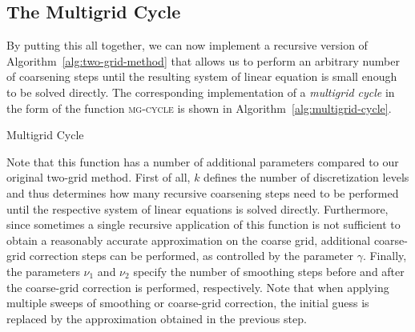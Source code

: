 \subsection{The Multigrid Cycle}\label{sec:multigrid-cycles}
By putting this all together, we can now implement a recursive version of Algorithm~\ref{alg:two-grid-method} that allows us to perform an arbitrary number of coarsening steps until the resulting system of linear equation is small enough to be solved directly.
The corresponding implementation of a \emph{multigrid cycle} in the form of the function \textsc{mg-cycle} is shown in Algorithm~\ref{alg:multigrid-cycle}.
\begin{algorithm}[ht]
	\caption{Multigrid Cycle}
	\label{alg:multigrid-cycle}
	\begin{algorithmic}
		\EndFor
		\Else
		\EndFor
		\EndIf
		\EndFor
		\State {}
		\EndFunction
	\end{algorithmic}
\end{algorithm}
Note that this function has a number of additional parameters compared to our original two-grid method.
First of all, $k$ defines the number of discretization levels and thus determines how many recursive coarsening steps need to be performed until the respective system of linear equations is solved directly.
Furthermore, since sometimes a single recursive application of this function is not sufficient to obtain a reasonably accurate approximation on the coarse grid, additional coarse-grid correction steps can be performed, as controlled by the parameter $\gamma$.
Finally, the parameters $\nu_1$ and $\nu_2$ specify the number of smoothing steps before and after the coarse-grid correction is performed, respectively.
Note that when applying multiple sweeps of smoothing or coarse-grid correction, the initial guess is replaced by the approximation obtained in the previous step.
